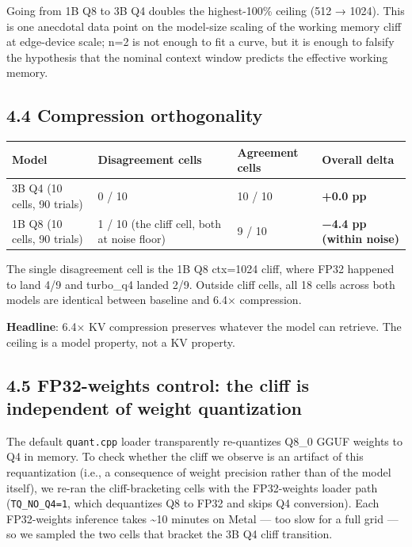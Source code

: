 \documentclass[11pt]{article}
\begin{document}
Going from 1B Q8 to 3B Q4 doubles the highest-100\% ceiling (512 → 1024). This is one anecdotal data point on the model-size scaling of the working memory cliff at edge-device scale; n=2 is not enough to fit a curve, but it is enough to falsify the hypothesis that the nominal context window predicts the effective working memory.


\subsection*{4.4 Compression orthogonality}


\begin{center}
\begin{tabular}{llll}
\toprule
Model & Disagreement cells & Agreement cells & Overall delta \\
\midrule
3B Q4 (10 cells, 90 trials) & 0 / 10 & 10 / 10 & \textbf{+0.0 pp} \\
1B Q8 (10 cells, 90 trials) & 1 / 10 (the cliff cell, both at noise floor) & 9 / 10 & \textbf{−4.4 pp (within noise)} \\
\bottomrule
\end{tabular}
\end{center}


The single disagreement cell is the 1B Q8 ctx=1024 cliff, where FP32 happened to land 4/9 and turbo\_q4 landed 2/9. Outside cliff cells, all 18 cells across both models are identical between baseline and 6.4× compression.


\textbf{Headline}: 6.4× KV compression preserves whatever the model can retrieve. The ceiling is a model property, not a KV property.


\subsection*{4.5 FP32-weights control: the cliff is independent of weight quantization}


The default \texttt{quant.cpp} loader transparently re-quantizes Q8\_0 GGUF weights to Q4 in memory. To check whether the cliff we observe is an artifact of this requantization (i.e., a consequence of weight precision rather than of the model itself), we re-ran the cliff-bracketing cells with the FP32-weights loader path (\texttt{TQ\_NO\_Q4=1}, which dequantizes Q8 to FP32 and skips Q4 conversion). Each FP32-weights inference takes \textasciitilde{}10 minutes on Metal — too slow for a full grid — so we sampled the two cells that bracket the 3B Q4 cliff transition.
\end{document}
